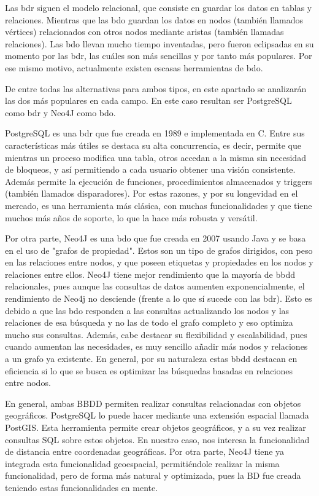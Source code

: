     Las \ac{bdr} siguen el modelo relacional, que consiste en guardar los datos en tablas y relaciones. Mientras que las \ac{bdo} guardan los datos en nodos (también llamados vértices) relacionados con otros nodos mediante aristas (también llamadas relaciones). Las \ac{bdo} llevan mucho tiempo inventadas, pero fueron eclipsadas en su momento por las \ac{bdr}, las cuáles son más sencillas y por tanto más populares. Por ese mismo motivo, actualmente existen escasas herramientas de \ac{bdo}.
    
    De entre todas las alternativas para ambos tipos, en este apartado se analizarán las dos más populares en cada campo. En este caso resultan ser PostgreSQL\cite{postgres} como \ac{bdr} y Neo4J\cite{neo4j} como \ac{bdo}.
    
    PostgreSQL es una \ac{bdr} que fue creada en 1989 e implementada en C. Entre sus características más útiles se destaca su alta concurrencia, es decir, permite que mientras un proceso modifica una tabla, otros accedan a la misma sin necesidad de bloqueos, y así permitiendo a cada usuario obtener una visión consistente. Además permite la ejecución de funciones, procedimientos almacenados y triggers (también llamados disparadores).
    Por estas razones, y por su longevidad en el mercado, es una herramienta más clásica, con muchas funcionalidades y que tiene muchos más años de soporte, lo que la hace más robusta y versátil.
    
    Por otra parte, Neo4J es una \ac{bdo} que fue creada en 2007 usando Java y se basa en el uso de "grafos de propiedad". Estos son un tipo de grafos dirigidos, con peso en las relaciones entre nodos, y que poseen etiquetas y propiedades en los nodos y relaciones entre ellos. Neo4J tiene mejor rendimiento que la mayoría de \ac{bbdd} relacionales, pues aunque las consultas de datos aumenten exponencialmente, el rendimiento de Neo4j no desciende (frente a lo que sí sucede con las \ac{bdr}). Esto es debido a que las \ac{bdo} responden a las consultas actualizando los nodos y las relaciones de esa búsqueda y no las de todo el grafo completo y eso optimiza mucho sus consultas.
    Además, cabe destacar su flexibilidad y escalabilidad, pues cuando aumentan las necesidades, es muy sencillo añadir más nodos y relaciones a un grafo ya existente.
    En general, por su naturaleza estas \ac{bbdd} destacan en eficiencia si lo que se busca es optimizar las búsquedas basadas en relaciones entre nodos. 
    
    En general, ambas BBDD permiten realizar consultas relacionadas con objetos geográficos.
    PostgreSQL lo puede hacer mediante una extensión espacial llamada PostGIS\cite{postgis}. Esta herramienta permite crear objetos geográficos, y a su vez realizar consultas SQL sobre estos objetos. En nuestro caso, nos interesa la funcionalidad de distancia entre coordenadas geográficas.
    Por otra parte, Neo4J tiene ya integrada esta funcionalidad geoespacial, permitiéndole realizar la misma funcionalidad, pero de forma más natural y optimizada, pues la BD fue creada teniendo estas funcionalidades en mente.
    
